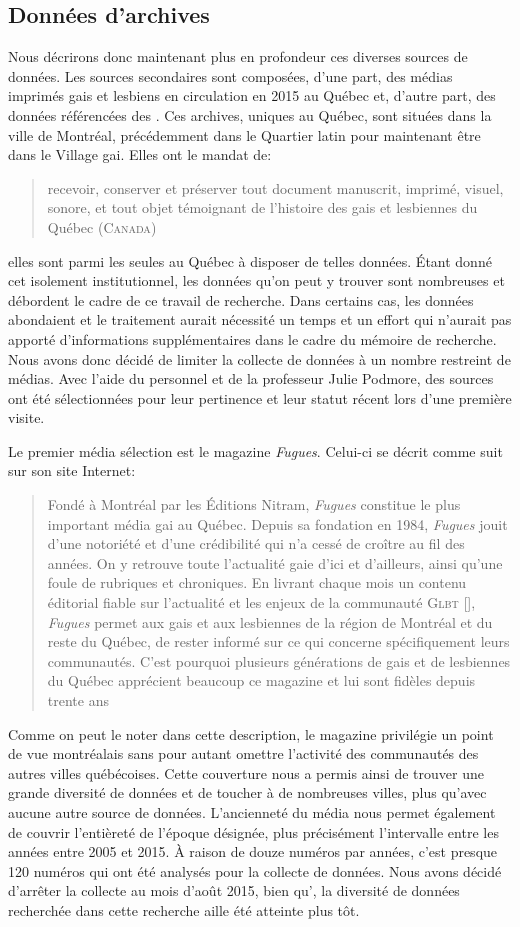 \subsection{Données d'archives}
\label{sub:donn_es_d_archives}
Nous décrirons donc maintenant plus en profondeur ces diverses sources de données.
Les sources secondaires sont composées, d'une part, des médias imprimés gais et lesbiens en circulation en 2015 au Québec et, d'autre part, des données référencées des \agq{}.
Ces archives, uniques au Québec, sont situées dans la ville de Montréal, précédemment dans le Quartier latin pour maintenant être dans le Village gai.
Elles ont le mandat de: \blockquote[{\cite{LAGQ2014}}][.]{\textelp{} recevoir, conserver et préserver tout document manuscrit, imprimé, visuel, sonore, et tout objet témoignant de l'histoire des gais et lesbiennes du Québec (\textsc{Canada})}; elles sont parmi les seules au Québec à disposer de telles données.
Étant donné cet isolement institutionnel, les données qu'on peut y trouver sont nombreuses et débordent le cadre de ce travail de recherche.
Dans certains cas, les données abondaient et le traitement aurait nécessité un temps et un effort qui n'aurait pas apporté d'informations supplémentaires dans le cadre du mémoire de recherche.
Nous avons donc décidé de limiter la collecte de données à un nombre restreint de médias.
Avec l'aide du personnel et de la professeur Julie Podmore, des sources ont été sélectionnées pour leur pertinence et leur statut récent lors d'une première visite.

Le premier média sélection est le magazine \emph{Fugues}.
Celui-ci se décrit comme suit sur son site Internet: \blockquote[{\cite{LesNitram2015}}][.]{Fondé à Montréal par les Éditions Nitram, \emph{Fugues} constitue le plus important média gai au Québec.
 Depuis sa fondation en 1984, \emph{Fugues} jouit d’une notoriété et d’une crédibilité qui n’a cessé de croître au fil des années.
 On y retrouve toute l’actualité gaie d’ici et d’ailleurs, ainsi qu'une foule de rubriques et chroniques.
 En livrant chaque mois un contenu éditorial fiable sur l’actualité et les enjeux de la communauté \textsc{Glbt} [], \emph{Fugues} permet aux gais et aux lesbiennes de la région de Montréal et du reste du Québec, de rester informé sur ce qui concerne spécifiquement leurs communautés.
C’est pourquoi plusieurs générations de gais et de lesbiennes du Québec apprécient beaucoup ce magazine et lui sont fidèles depuis trente ans}
Comme on peut le noter dans cette description, le magazine privilégie un point de vue montréalais sans pour autant omettre l'activité des communautés \lgbt{} des autres villes québécoises.
Cette couverture nous a permis ainsi de trouver une grande diversité de données et de toucher à de nombreuses villes, plus qu'avec aucune autre source de données.
L'ancienneté du média nous permet également de couvrir l'entièreté de l'époque désignée, plus précisément l'intervalle entre les années entre 2005 et 2015.
À raison de douze numéros par années, c'est presque 120 numéros qui ont été analysés pour la collecte de données.
Nous avons décidé d'arrêter la collecte au mois d'août 2015, bien qu', la diversité de données recherchée dans cette recherche aille été atteinte plus tôt.

